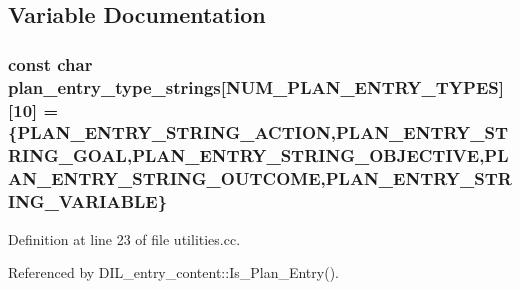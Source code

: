 \subsection{Variable Documentation}
\subsubsection{\setlength{\rightskip}{0pt plus 5cm}const char plan\_\-entry\_\-type\_\-strings[NUM\_\-PLAN\_\-ENTRY\_\-TYPES][10] = \{PLAN\_\-ENTRY\_\-STRING\_\-ACTION,PLAN\_\-ENTRY\_\-STRING\_\-GOAL,PLAN\_\-ENTRY\_\-STRING\_\-OBJECTIVE,PLAN\_\-ENTRY\_\-STRING\_\-OUTCOME,PLAN\_\-ENTRY\_\-STRING\_\-VARIABLE\}}\label{utilities_8cc_a11}




Definition at line 23 of file utilities.cc.

Referenced by DIL\_\-entry\_\-content::Is\_\-Plan\_\-Entry().